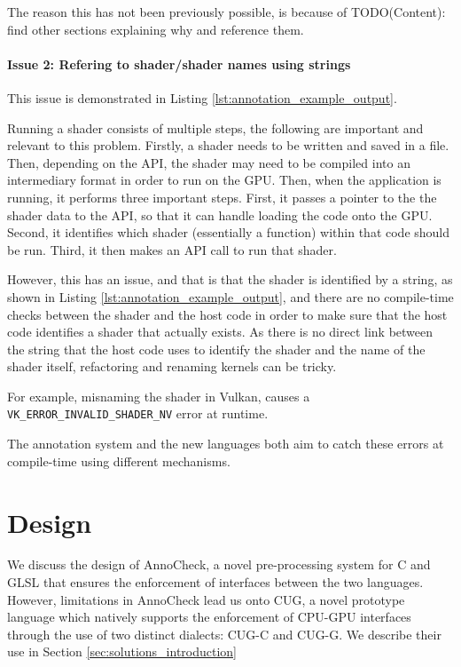 \documentclass[a4paper,12pt,twoside,openright]{report}
\begin{document}
The reason this has not been previously possible, is because of TODO(Content): find
other sections explaining why and reference them.

\subsubsection{Issue 2: Refering to shader/shader names using strings}

This issue is demonstrated in Listing \ref{lst:annotation_example_output}.

Running a shader consists of multiple steps, the following are important and
relevant to this problem. Firstly, a shader needs to be written and saved in a
file. Then, depending on the API, the shader may need to be compiled into an
intermediary format in order to run on the GPU. Then, when the application is
running, it performs three important steps. First, it passes a pointer to the
the shader data to the API, so that it can handle loading the code onto the
GPU. Second, it identifies which shader (essentially a function) within that
code should be run. Third, it then makes an API call to run that shader.

However, this has an issue, and that is that the shader is identified by a
string, as shown in Listing \ref{lst:annotation_example_output}, and there are
no compile-time checks between the shader and the host code in order to make
sure that the host code identifies a shader that actually exists. As there is
no direct link between the string that the host code uses to identify the
shader and the name of the shader itself, refactoring and renaming kernels can
be tricky.

For example, misnaming the shader in Vulkan, causes a
\texttt{VK\_ERROR\_INVALID\_SHADER\_NV} error at runtime.



The annotation system and the new languages both aim to catch these errors at
compile-time using different mechanisms.

\chapter{Design}

We discuss the design of AnnoCheck, a novel pre-processing system for C and
GLSL that ensures the enforcement of interfaces between the two languages.
However, limitations in AnnoCheck lead us onto CUG, a novel prototype language
which natively supports the enforcement of CPU-GPU interfaces through the use
of two distinct dialects: CUG-C and CUG-G. We describe their use in Section
\ref{sec:solutions_introduction}
\end{document}
